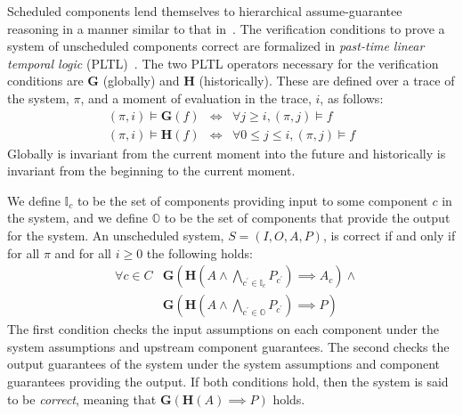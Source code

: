 
\newcommand{\globally}{\ensuremath{\mathbf{G}}}
\newcommand{\historically}{\ensuremath{\mathbf{H}}}
\newcommand{\assumes}{\ensuremath{A}}
\newcommand{\guarantees}{\ensuremath{P}}
\newcommand{\dispatch}{\ensuremath{\mathit{dispatch}}}
\newcommand{\complete}{\ensuremath{\mathit{complete}}}
\newcommand{\same}[1]{\ensuremath{\mathit{same}(#1)}}
\newcommand{\inputs}{\ensuremath{I}}
\newcommand{\outputs}{\ensuremath{O}}
\newcommand{\system}{\ensuremath{S}}
\newcommand{\components}{\ensuremath{C}}
\newcommand{\schedule}{\ensuremath{\phi}}
\newcommand{\valid}{\ensuremath{\mathit{valid}}}
\newcommand{\dpred}{\ensuremath{\delta^\phi}}
\newcommand{\dispred}{\ensuremath{\mathbb{D}^\phi}}
\newcommand{\compred}{\ensuremath{\mathbb{C}^\phi}}
\newcommand{\dispredp}{\ensuremath{\mathbb{D}^{\phi\prime}}}
\newcommand{\compredp}{\ensuremath{\mathbb{C}^{\phi\prime}}}


Scheduled components lend themselves to hierarchical assume-guarantee reasoning in a manner similar to that in~\cite{AGREE2}.
The verification conditions to prove a system of unscheduled components correct are formalized in \emph{past-time linear temporal logic} (PLTL)~\cite{PLTL}. 
The two PLTL operators necessary for the verification conditions are $\globally$ (globally) and $\historically$ (historically).
These are defined over a trace of the system, $\pi$, and a moment of evaluation in the trace, $i$, as follows:
\begin{eqnarray*}
 (\pi, i) \models \globally(f) & \iff & \forall j \ge i, (\pi, j) \models f \\
(\pi, i) \models \historically(f) & \iff & \forall 0 \le j \le i, (\pi, j) \models f
\end{eqnarray*}
Globally is invariant from the current moment into the future and historically is invariant from the beginning to the current moment.

We define $\mathbb{I}_c$ to be the set of components providing input to some component $c$ in the system, and we define $\mathbb{O}$ to be the set of components that provide the output for the system. An unscheduled system, $\system = (\inputs, \outputs, \assumes, \guarantees)$, is correct if and only if for all $\pi$ and for all $i \ge 0$ the following holds:
\[
\begin{array}{lll}
        & \forall c \in \components &  
            \globally(\historically(\assumes \wedge 
            \bigwedge_{c^\prime \in \mathbb{I}_c} P_{c^\prime}) 
            \implies \assumes_c)  \wedge \\
 &   & 
            \globally(\historically(\assumes \wedge 
            \bigwedge_{c^\prime \in \mathbb{O}} \guarantees_{c^\prime}) 
            \implies \guarantees)
\end{array}
\]
The first condition checks the input assumptions on each component under the system assumptions and upstream component guarantees. The second checks the output guarantees of the system under the system assumptions and component guarantees providing the output.  If both conditions hold, then the system is said to be \emph{correct}, meaning that $\globally(\historically(\assumes) \implies \guarantees)$ holds.

